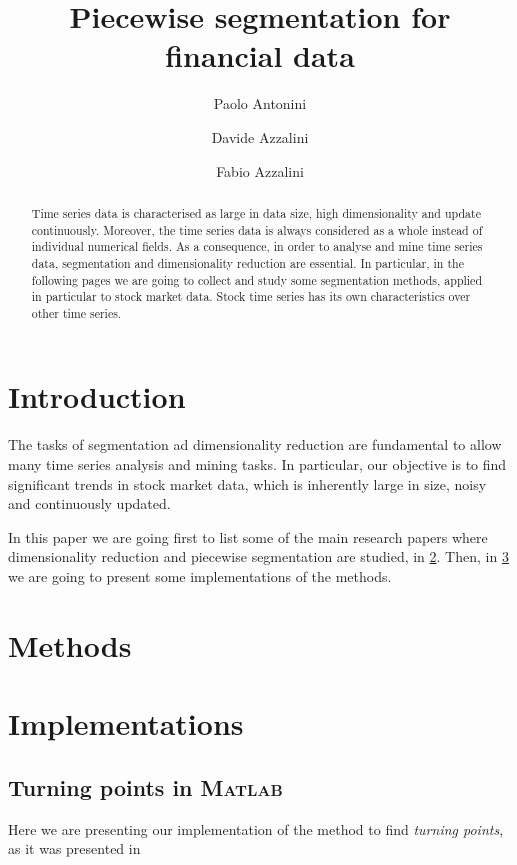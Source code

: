 \documentclass{article}
\title{Piecewise segmentation for financial data}
\author{Paolo Antonini \and Davide Azzalini \and Fabio Azzalini}
\date{}
\newcommand{\matlab}{\textsc{Matlab}\xspace}
\begin{document}
\maketitle


\begin{abstract}
Time series data is characterised as large in data size, high dimensionality and update continuously. Moreover, the time series data is always considered as a whole instead of individual numerical fields. As a consequence, in order to analyse and mine time series data, segmentation and dimensionality reduction are essential. In particular, in the following pages we are going to collect and study some segmentation methods, applied in particular to stock market data. Stock time series has its own characteristics over other time series. 
\end{abstract}

\section{Introduction}
The tasks of segmentation ad dimensionality reduction are fundamental to allow many time series analysis and mining tasks. In particular, our objective is to find significant trends in stock market data, which is inherently large in size, noisy and continuously updated. 

In this paper we are going first to list some of the main research papers where dimensionality reduction and piecewise segmentation are studied, in \cref{sec:methods}. Then, in \cref{sec:implementations} we are going to present some implementations of the methods. 


\section{Methods}\label{sec:methods}
\lipsum[1-3]


\section{Implementations}\label{sec:implementations}

\lipsum[7]

\subsection{Turning points in \matlab}

Here we are presenting our implementation of the method to find \emph{turning points}, as it was presented in %
\end{document}
